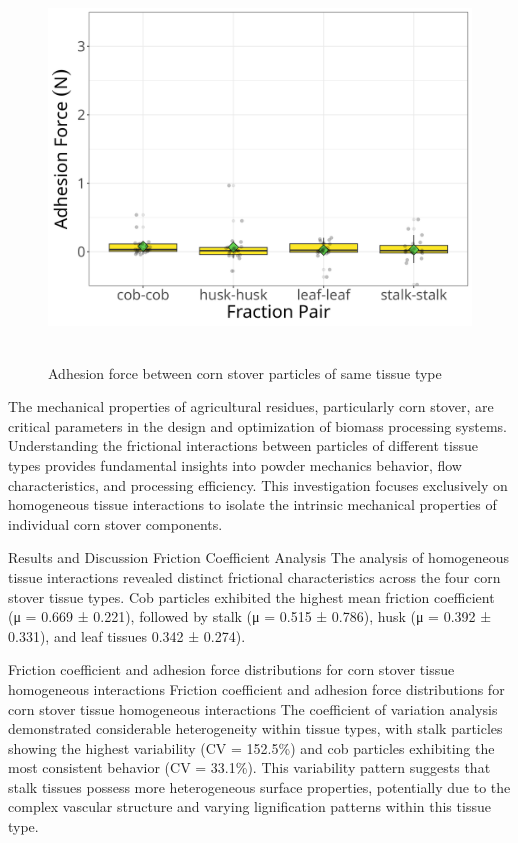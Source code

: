 \documentclass[xcolor=dvipsnames,10pt,hidelinks]{article}
\begin{document}
\newpage

\begin{figure}[htbp]
\centering
\includegraphics[height=4in]{./figures/cs_cs_same_fraction_coeff_c_box_plt.png}
\caption{\label{fig:org72ceeb9}Adhesion force between corn stover particles of same tissue type}
\end{figure}



The mechanical properties of agricultural residues, particularly corn stover, are critical parameters in the design and optimization of biomass processing systems. Understanding the frictional interactions between particles of different tissue types provides fundamental insights into powder mechanics behavior, flow characteristics, and processing efficiency. This investigation focuses exclusively on homogeneous tissue interactions to isolate the intrinsic mechanical properties of individual corn stover components.

Results and Discussion
Friction Coefficient Analysis
The analysis of homogeneous tissue interactions revealed distinct frictional characteristics across the four corn stover tissue types. Cob particles exhibited the highest mean friction coefficient (μ = 0.669 ± 0.221), followed by stalk (μ = 0.515 ± 0.786), husk (μ = 0.392 ± 0.331), and leaf tissues 0.342 ± 0.274).

Friction coefficient and adhesion force distributions for corn stover tissue homogeneous interactions
Friction coefficient and adhesion force distributions for corn stover tissue homogeneous interactions
The coefficient of variation analysis demonstrated considerable heterogeneity within tissue types, with stalk particles showing the highest variability (CV = 152.5\%) and cob particles exhibiting the most consistent behavior (CV = 33.1\%). This variability pattern suggests that stalk tissues possess more heterogeneous surface properties, potentially due to the complex vascular structure and varying lignification patterns within this tissue type.
\end{document}
